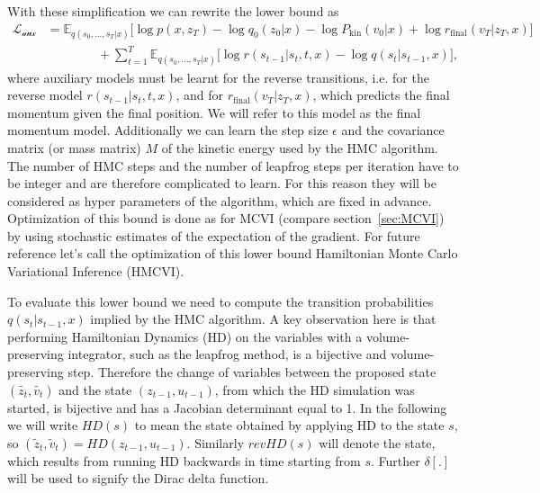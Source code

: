 \documentclass[12pt]{scrartcl}
\newcommand{\E}{\mathbb{E}}
\begin{document}
With these simplification we can rewrite the lower bound as
\begin{equation} \label{eq:HMCVIAuxLowerBound}
\begin{split}
\mathcal{L_\textrm{aux}} & = \E_{q(s_0, \ldots, s_T|x)} \big[ \log p(x, z_T) - \log q_0(z_0|x) - \log P_\textrm{kin}(v_0|x)  + \log r_{\textrm{final}}(v_T | z_T, x) \big] \\ 
& \qquad\qquad + \sum \limits_{t=1}^T \E_{q(s_0, \ldots, s_T|x)} \Big[ \log r(s_{t-1}|s_t, t, x) - \log q(s_t|s_{t-1}, x) \Big],
\end{split}
\end{equation}
where auxiliary models must be learnt for the reverse transitions, i.e. for the reverse model $r(s_{t-1}|s_t, t, x)$, and for $r_{\textrm{final}}(v_T | z_T, x)$, which predicts the final momentum given the final position. We will refer to this model as the final momentum model. Additionally we can learn the step size $\epsilon$ and the covariance matrix (or mass matrix) $M$ of the kinetic energy used by the HMC algorithm. The number of HMC steps and the number of leapfrog steps per iteration have to be integer and are therefore complicated to learn. For this reason they will be considered as hyper parameters of the algorithm, which are fixed in advance. Optimization of this bound is done as for MCVI (compare section~\ref{sec:MCVI}) by using stochastic estimates of the expectation of the gradient. For future reference let's call the optimization of this lower bound Hamiltonian Monte Carlo Variational Inference (HMCVI).

To evaluate this lower bound we need to compute the transition probabilities $q(s_t|s_{t-1}, x)$ implied by the HMC algorithm. A key observation here is that performing Hamiltonian Dynamics (HD) on the variables with a volume-preserving integrator, such as the leapfrog method, is a bijective and volume-preserving step. Therefore the change of variables between the proposed state $(\tilde{z_t}, \tilde{v_t})$ and the state $(z_{t-1}, u_{t-1})$, from which the HD simulation was started, is bijective and has a Jacobian determinant equal to 1. In the following we will write $HD(s)$ to mean the state obtained by applying HD to the state $s$, so $(\tilde{z}_t, \tilde{v}_t) = HD(z_{t-1}, u_{t-1})$. Similarly $revHD(s)$ will denote the state, which results from running HD backwards in time starting from $s$. Further $\delta[.]$ will be used to signify the Dirac delta function.
\end{document}
